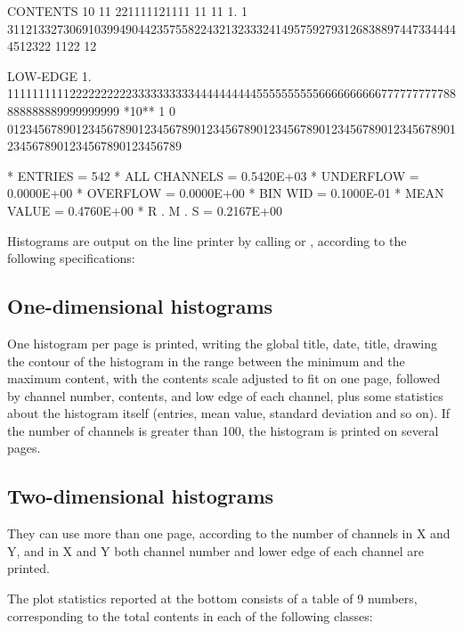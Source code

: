 \begin{Listing}
 CONTENTS  10                        11  221111121111                             11 11                             
            1.            1 3112133273069103994904423575582243213233324149575927931268388974473344444512322 1122 12 
 
 LOW-EDGE   1.            111111111122222222223333333333444444444455555555556666666666777777777788888888889999999999
 *10**  1   0   0123456789012345678901234567890123456789012345678901234567890123456789012345678901234567890123456789
 
 * ENTRIES =        542      * ALL CHANNELS = 0.5420E+03      * UNDERFLOW = 0.0000E+00      * OVERFLOW = 0.0000E+00
 * BIN WID = 0.1000E-01      * MEAN VALUE   = 0.4760E+00      * R . M . S = 0.2167E+00
\end{Listing}
\newpage

Histograms are output on the line printer by calling
 or ,
according to the following specifications:
 
\subsection*{One-dimensional histograms}
 
One histogram per page is printed, writing the global title, date,
title, drawing the contour of the histogram in the range between the
minimum and the maximum content, with the contents scale adjusted
to fit on one page,
followed by channel number, contents, and low edge of each channel,
plus some statistics about the histogram itself (entries, mean value,
standard deviation and so on).
If the number of channels is greater than 100,
the histogram is printed on several pages.
 
\subsection*{Two-dimensional histograms}
 
\par They can use more than one page, according to the number of channels
in X and Y, and in X and Y both channel number and lower edge of each
channel are printed.
 
The plot statistics reported at the bottom consists of a table
of 9 numbers, corresponding
to the total contents in each of the following classes:
 
